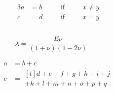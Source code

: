 \documentclass{article}
\begin{document}
\begin{alignat*}{3}
  a& = b &\quad & \text{if} & \quad & x\ne y\\
  c& = d &      & \text{if} &       & x = y
\end{alignat*}    


\begin{equation}\label{eq:elas:C}
\end{equation}

\begin{equation}\label{eq:elas:lam-mu}
  \lambda = \frac{E \nu}{ (1+\nu)(1-2\nu)} \qquad
\end{equation}


\begin{align}
  a & = b + c \\
  c & =
      \begin{multlined}[t]
        d + e + f + g + h + i + j \\
        + k + l + m + n + o + p + q
      \end{multlined}
\end{align}
\end{document}
